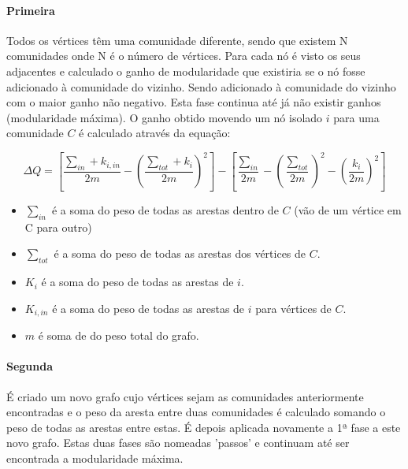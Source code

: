 \paragraph{Primeira}
Todos os vértices têm uma comunidade diferente, sendo que existem N comunidades onde N é o número de vértices.
Para cada nó é visto os seus adjacentes e calculado o ganho de modularidade que existiria se o nó fosse adicionado à comunidade do vizinho. Sendo adicionado à comunidade do vizinho com o maior ganho não negativo. Esta fase continua até já não existir ganhos (modularidade máxima).
O ganho obtido movendo um nó isolado $i$ para uma comunidade $C$ é calculado através da equação:


\begin{equation}
\label{eq:GND}
 \Delta Q  =  [\frac{\sum_{in} + k_{i,in}}{2m} - (\frac{\sum_{tot} +k_i}{2m})^2] - [\frac{\sum_{in}}{2m} - (\frac{\sum_{tot}}{2m})^2 - (\frac{k_i}{2m})^2] 
\end{equation}

\begin{itemize}
	\item $\sum_{in}$ é a soma do peso de todas as arestas dentro de $C$ (vão de um vértice em C para outro)
	\item $\sum_{tot}$ é a soma do peso de todas as arestas dos vértices de $C$. %
	\item $K_i$ é a soma do peso de todas as arestas de $i$. %
	\item $K_{i,in}$ é a soma do peso de todas as arestas de $i$ para vértices de $C$.
	\item $m$ é soma de do peso total do grafo.
\end{itemize}

\paragraph{Segunda}
É criado um novo grafo cujo vértices sejam as comunidades anteriormente encontradas e o peso da aresta entre duas comunidades é calculado somando o peso de todas as arestas entre estas. É depois aplicada novamente a 1ª fase a este novo grafo.
Estas duas fases são nomeadas 'passos' e continuam até ser encontrada a modularidade máxima.


